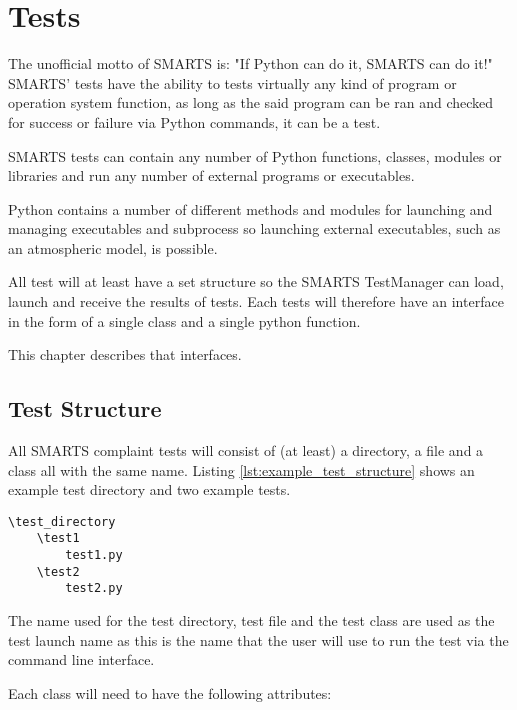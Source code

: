 \chapter{Tests}
\label{chap:tests}

The unofficial motto of SMARTS is: "If Python can do it, SMARTS can do it!"
SMARTS' tests have the ability to tests virtually any kind of program or
operation system function, as long as the said program can be ran and checked
for success or failure via Python commands, it can be a test.

SMARTS tests can contain any number of Python functions, classes, modules or
libraries and run any number of external programs or executables. 

Python contains a number of different methods and modules for launching and
managing executables and subprocess so launching external executables, such as
an atmospheric model, is possible.

All test will at least have a set structure so the SMARTS TestManager can
load, launch and receive the results of tests. Each tests will therefore have
an interface in the form of a single class and a single python function.

This chapter describes that interfaces.

\section{Test Structure}
\label{sec:test_structure}

All SMARTS complaint tests will consist of (at least) a directory, a file and a
class all with the same name. Listing \ref{lst:example_test_structure} shows an
example test directory and two example tests.

\begin{lstlisting}[language=Clean, 
                   caption={Example Test Structure},
                   label={lst:example_test_structure}]
\test_directory
    \test1
        test1.py
    \test2
        test2.py
\end{lstlisting}

The name used for the test directory, test file and the test class are used as
the test launch name as this is the name that the user will use to run the test
via the \smartspy command line interface.

Each class will need to have the following attributes:

